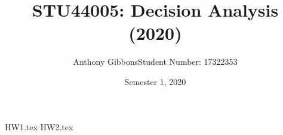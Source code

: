\documentclass[a4paper]{article}
\title{STU44005: Decision Analysis (2020)}
\author{Anthony Gibbons\quad Student Number: 17322353}
\date{Semester 1, 2020}
\begin{document}
\maketitle   

{HW1.tex}
\pagebreak
{HW2.tex}
\end{document}
